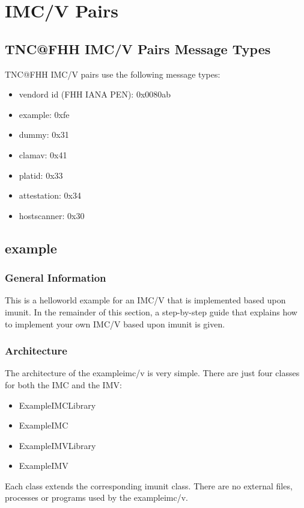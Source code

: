 \documentclass[a4paper,10pt]{scrartcl}
\begin{document}
\section{IMC/V Pairs}
\subsection{TNC@FHH IMC/V Pairs Message Types}\label{sec:message-types}
TNC@FHH IMC/V pairs use the following message types:
\begin{itemize}
	\item vendord id (FHH IANA PEN): 0x0080ab
	\item example: 0xfe
	\item dummy: 0x31
	\item clamav: 0x41
	\item platid: 0x33
	\item attestation: 0x34
	\item hostscanner: 0x30
\end{itemize}

\subsection{example}\label{sec:example-imcv}
\subsubsection{General Information}
This is a helloworld example for an IMC/V that is implemented based upon imunit.
In the remainder of this section, a step-by-step guide that explains how to implement
your own IMC/V based upon imunit is given.

\subsubsection{Architecture}
The architecture of the exampleimc/v is very simple. There are just four classes
for both the IMC and the IMV:
\begin{itemize}
	\item ExampleIMCLibrary
	\item ExampleIMC
	\item ExampleIMVLibrary
	\item ExampleIMV
\end{itemize}
Each class extends the corresponding imunit class. There are no external files,
processes or programs used by the exampleimc/v.
\end{document}
